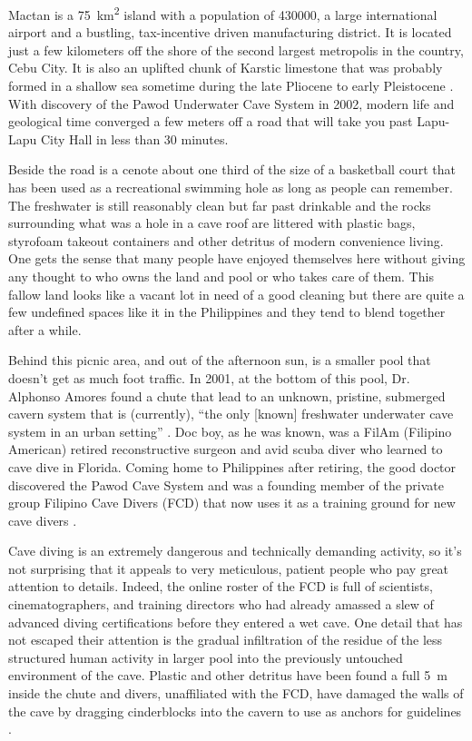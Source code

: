 \documentclass[english]{ijsra}
\begin{document}

Mactan is a \SI{75}{\kilo\metre\squared} island with a population of \num{430000}, a large international airport and a bustling, tax-incentive driven manufacturing district. It is located just a few kilometers off the shore of the second largest metropolis in the country, Cebu City. 
It is also an uplifted chunk of Karstic limestone that was probably formed in a shallow sea sometime during the late Pliocene to early Pleistocene \parencite{Aleta_2003}. With discovery of the Pawod Underwater Cave System in 2002, modern life and geological time converged a few meters off a road that will take you past Lapu-Lapu City Hall in less than 30 minutes.

Beside the road is a cenote about one third of the size of a basketball court that has been used as a recreational swimming hole as long as people can remember. The freshwater is still reasonably clean but far past drinkable and the rocks surrounding what was a hole in a cave roof are littered with plastic bags, styrofoam takeout containers and other detritus of modern convenience living. One gets the sense that many people have enjoyed themselves here without giving any thought to who owns the land and pool or who takes care of them. This fallow land looks like a vacant lot in need of a good cleaning but there are quite a few undefined spaces like it in the Philippines and they tend to blend together after a while. 

Behind this picnic area, and out of the afternoon sun, is a smaller pool that doesn’t get as much foot traffic.  In 2001, at the bottom of this pool, Dr. Alphonso Amores found a chute that lead to an unknown, pristine, submerged cavern system that is (currently), “the only [known] freshwater underwater cave system in an urban setting” \parencite{Ta-as_2014}. 
Doc boy, as he was known, was a FilAm (Filipino American) retired reconstructive surgeon and avid scuba diver who learned to cave dive in Florida. Coming home to Philippines after retiring, the good doctor discovered the Pawod Cave System and was a founding member of the private group Filipino Cave Divers (FCD) that now uses it as a training ground for new cave divers \parencite{Divers_2014b}. 

Cave diving is an extremely dangerous and technically demanding activity, so it’s not surprising that it appeals to very meticulous, patient people who pay great attention to details. Indeed, the online roster of the FCD is full of scientists, cinematographers, and training directors who had already amassed a slew of advanced diving certifications before they entered a wet cave. One detail that has not escaped their attention is the gradual infiltration of the residue of the less structured human activity in larger pool into the previously untouched environment of the cave. Plastic and other detritus have been found a full \SI{5}{\metre} inside the chute and divers, unaffiliated with the FCD, have damaged the walls of the cave by dragging cinderblocks into the cavern to use as anchors for guidelines \parencite{Divers_2014a}.
\end{document}
